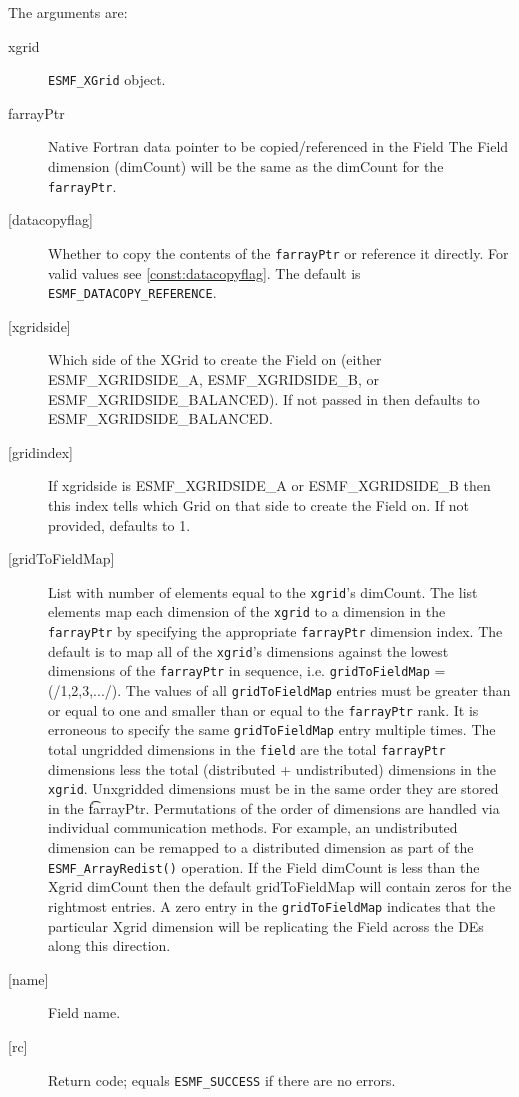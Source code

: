    The arguments are: 
   \begin{description} 
   \item [xgrid] 
   {\tt ESMF\_XGrid} object. 
   \item [farrayPtr] 
   Native Fortran data pointer to be copied/referenced in the Field 
   The Field dimension (dimCount) will be the same as the dimCount 
   for the {\tt farrayPtr}. 
   \item [{[datacopyflag]}] 
   Whether to copy the contents of the {\tt farrayPtr} or reference it directly. 
   For valid values see \ref{const:datacopyflag}. The default is 
   {\tt ESMF\_DATACOPY\_REFERENCE}. 
   \item [{[xgridside]}] 
   Which side of the XGrid to create the Field on (either ESMF\_XGRIDSIDE\_A, 
   ESMF\_XGRIDSIDE\_B, or ESMF\_XGRIDSIDE\_BALANCED). If not passed in then 
   defaults to ESMF\_XGRIDSIDE\_BALANCED. 
   \item [{[gridindex]}] 
   If xgridside is ESMF\_XGRIDSIDE\_A or ESMF\_XGRIDSIDE\_B then this index tells which Grid on 
   that side to create the Field on. If not provided, defaults to 1. 
   \item [{[gridToFieldMap]}] 
   List with number of elements equal to the 
   {\tt xgrid}'s dimCount. The list elements map each dimension 
   of the {\tt xgrid} to a dimension in the {\tt farrayPtr} by 
   specifying the appropriate {\tt farrayPtr} dimension index. The default is to 
   map all of the {\tt xgrid}'s dimensions against the lowest dimensions of 
   the {\tt farrayPtr} in sequence, i.e. {\tt gridToFieldMap} = (/1,2,3,.../). 
   The values of all {\tt gridToFieldMap} entries must be greater than or equal 
   to one and smaller than or equal to the {\tt farrayPtr} rank. 
   It is erroneous to specify the same {\tt gridToFieldMap} entry 
   multiple times. The total ungridded dimensions in the {\tt field} 
   are the total {\tt farrayPtr} dimensions less 
   the total (distributed + undistributed) dimensions in 
   the {\tt xgrid}. Unxgridded dimensions must be in the same order they are 
   stored in the {\t farrayPtr}. Permutations of the order of 
   dimensions are handled via individual communication methods. For example, 
   an undistributed dimension can be remapped to a distributed dimension 
   as part of the {\tt ESMF\_ArrayRedist()} operation. 
   If the Field dimCount is less than the Xgrid dimCount then the default 
   gridToFieldMap will contain zeros for the rightmost entries. A zero 
   entry in the {\tt gridToFieldMap} indicates that the particular 
   Xgrid dimension will be replicating the Field across the DEs along 
   this direction. 
   \item [{[name]}] 
   Field name. 
   \item [{[rc]}] 
   Return code; equals {\tt ESMF\_SUCCESS} if there are no errors. 
   \end{description} 
    

